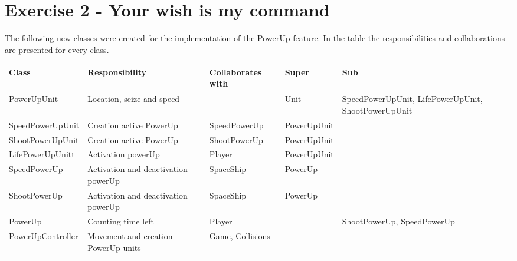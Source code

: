 \section*{Exercise 2 - Your wish is my command}
The following new classes were created for the implementation of the PowerUp feature.
In the table the responsibilities and collaborations are presented for every class.
\begin{center}
    \begin{tabular}{ | p{3cm} | p{4cm} | p{3cm} | p{2cm} | p{3cm} |}
  \hline
    Class & Responsibility & Collaborates with & Super & Sub \\ \hline
   PowerUpUnit & Location, seize and speed  &  & Unit & SpeedPowerUpUnit, LifePowerUpUnit, ShootPowerUpUnit \\ \hline
   SpeedPowerUpUnit & Creation active PowerUp  & SpeedPowerUp & PowerUpUnit & \\ \hline
  ShootPowerUpUnit & Creation active PowerUp & ShootPowerUp & PowerUpUnit & \\ \hline
  LifePowerUpUnitt & Activation powerUp & Player  & PowerUpUnit & \\ \hline
   SpeedPowerUp & Activation and deactivation powerUp & SpaceShip & PowerUp & \\ \hline
  ShootPowerUp & Activation and deactivation powerUp & SpaceShip & PowerUp &  \\  \hline
   PowerUp & Counting time left  & Player &  & ShootPowerUp, SpeedPowerUp  \\  \hline
   PowerUpController & Movement and creation PowerUp units & Game, Collisions &  &  \\  \hline
 
    \end{tabular}
\end{center}

\newpage
